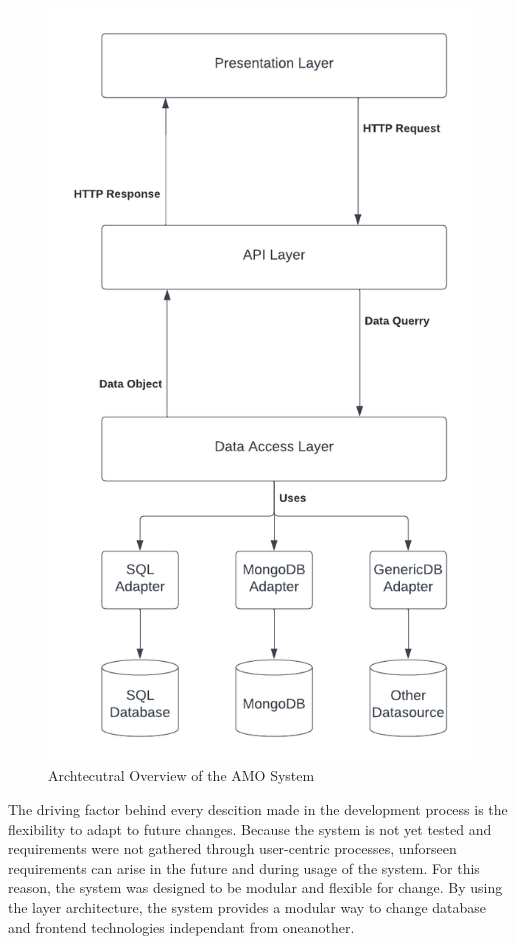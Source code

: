 \begin{figure}
    \centering
    \includegraphics[scale=0.5]{IMG/amo_architecture}
    \caption{Archtecutral Overview of the AMO System}
    \label{fig:architecural_overview}
\end{figure}

The driving factor behind every descition made in the development process is the flexibility to adapt to future changes.  Because
the system is not yet tested and requirements were not gathered through user-centric processes, unforseen requirements can arise
in the future and during usage of the system. For this reason, the system was designed to be modular and flexible for change.  By
using the layer architecture, the system provides a modular way to change database and frontend technologies independant from
oneanother.

